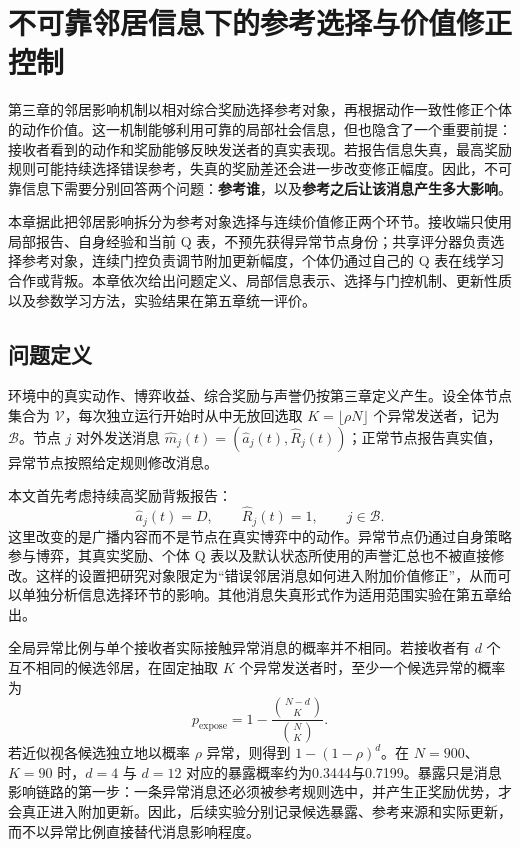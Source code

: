\chapter{不可靠邻居信息下的参考选择与价值修正控制}
\label{chap:work2}

第三章的邻居影响机制以相对综合奖励选择参考对象，再根据动作一致性修正个体的动作价值。这一机制能够利用可靠的局部社会信息，但也隐含了一个重要前提：接收者看到的动作和奖励能够反映发送者的真实表现。若报告信息失真，最高奖励规则可能持续选择错误参考，失真的奖励差还会进一步改变修正幅度。因此，不可靠信息下需要分别回答两个问题：\textbf{参考谁}，以及\textbf{参考之后让该消息产生多大影响}。

本章据此把邻居影响拆分为参考对象选择与连续价值修正两个环节。接收端只使用局部报告、自身经验和当前 Q 表，不预先获得异常节点身份；共享评分器负责选择参考对象，连续门控负责调节附加更新幅度，个体仍通过自己的 Q 表在线学习合作或背叛。本章依次给出问题定义、局部信息表示、选择与门控机制、更新性质以及参数学习方法，实验结果在第五章统一评价。

\section{问题定义}

环境中的真实动作、博弈收益、综合奖励与声誉仍按第三章定义产生。设全体节点集合为 $\mathcal V$，每次独立运行开始时从中无放回选取
$K=\lfloor\rho N\rfloor$ 个异常发送者，记为 $\mathcal B$。节点 $j$ 对外发送消息
$\widehat m_j(t)=(\widehat a_j(t),\widehat R_j(t))$；正常节点报告真实值，异常节点按照给定规则修改消息。

本文首先考虑持续高奖励背叛报告：
\begin{equation}
 \widehat a_j(t)=D,\qquad \widehat R_j(t)=1,\qquad j\in\mathcal B.
 \label{eq:w2-high-defect}
\end{equation}
这里改变的是广播内容而不是节点在真实博弈中的动作。异常节点仍通过自身策略参与博弈，其真实奖励、个体 Q 表以及默认状态所使用的声誉汇总也不被直接修改。这样的设置把研究对象限定为“错误邻居消息如何进入附加价值修正”，从而可以单独分析信息选择环节的影响。其他消息失真形式作为适用范围实验在第五章给出。

全局异常比例与单个接收者实际接触异常消息的概率并不相同。若接收者有 $d$ 个互不相同的候选邻居，在固定抽取 $K$ 个异常发送者时，至少一个候选异常的概率为
\begin{equation}
 p_{\mathrm{expose}}=1-\frac{\binom{N-d}{K}}{\binom{N}{K}}.
 \label{eq:w2-exposure}
\end{equation}
若近似视各候选独立地以概率 $\rho$ 异常，则得到 $1-(1-\rho)^d$。在 $N=900$、$K=90$ 时，$d=4$ 与 $d=12$ 对应的暴露概率约为0.3444与0.7199。暴露只是消息影响链路的第一步：一条异常消息还必须被参考规则选中，并产生正奖励优势，才会真正进入附加更新。因此，后续实验分别记录候选暴露、参考来源和实际更新，而不以异常比例直接替代消息影响程度。


